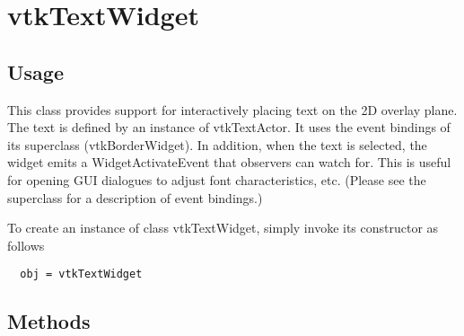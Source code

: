 \section{vtkTextWidget}

\subsection{Usage}

 This class provides support for interactively placing text on the 2D
 overlay plane. The text is defined by an instance of vtkTextActor. It uses
 the event bindings of its superclass (vtkBorderWidget). In addition, when
 the text is selected, the widget emits a WidgetActivateEvent that
 observers can watch for. This is useful for opening GUI dialogues to
 adjust font characteristics, etc. (Please see the superclass for a
 description of event bindings.)

To create an instance of class vtkTextWidget, simply
invoke its constructor as follows
\begin{verbatim}
  obj = vtkTextWidget
\end{verbatim}
\subsection{Methods}

